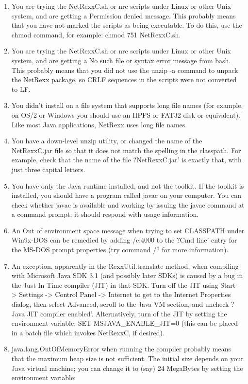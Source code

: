 \begin{enumerate}
\item You are trying the NetRexxC.sh or nrc scripts under Linux or other Unix system, and are getting a Permission denied message. This probably means that you have not marked the scripts as being executable. To do this, use the chmod command, for example: chmod 751 NetRexxC.sh.
\item You are trying the NetRexxC.sh or nrc scripts under Linux or other Unix system, and are getting a No such file or syntax error message from bash. This probably means that you did not use the unzip -a command to unpack the NetRexx package, so CRLF sequences in the scripts were not converted to LF.
\item You didn't install on a file system that supports long file names (for example, on OS/2 or Windows you should use an HPFS or FAT32 disk or equivalent). Like most Java applications, NetRexx uses long file names.
\item You have a down-level unzip utility, or changed the name of the NetRexxC.jar file so that it does not match the spelling in the classpath. For example, check that the name of the file ?NetRexxC.jar’ is exactly that, with just three capital letters.
\item You have only the Java runtime installed, and not the toolkit. If the toolkit is installed, you should have a program called javac on your computer. You can check whether javac is available and working by issuing the javac command at a command prompt; it should respond with usage information.
\item An Out of environment space message when trying to set CLASSPATH under Win9x-DOS can be remedied by adding /e:4000 to the ?Cmd line’ entry for the MS-DOS prompt properties (try command /? for more information).
\item An exception, apparently in the RexxUtil.translate method, when compiling with Microsoft Java SDK 3.1 (and possibly later SDKs) is caused by a bug in the Just In Time compiler (JIT) in that SDK. Turn off the JIT using Start -> Settings -> Control Panel -> Internet to get to the Internet Properties dialog, then select Advanced, scroll to the Java VM section, and uncheck ?Java JIT compiler enabled’. Alternatively, turn of the JIT by setting the environment variable:
  SET MSJAVA\_ENABLE\_JIT=0
(this can be placed in a batch file which invokes NetRexxC, if desired).
\item java.lang.OutOfMemoryError when running the compiler probably means that the maximum heap size is not sufficient. The initial size depends on your Java virtual machine; you can change it to (say) 24 MegaBytes by setting the environment variable:

\end{enumerate}
